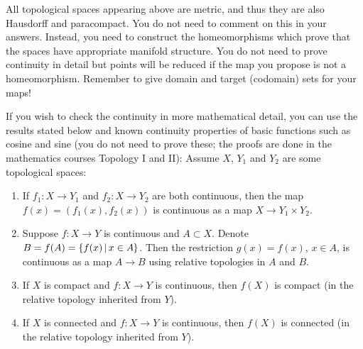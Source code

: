 \documentclass[12pt]{article}
\newcommand{\defset}[2]{ \left\{ #1 \left|\, #2\makebox[0pt]{$\displaystyle\phantom{#1}$}\right.\!\right\} }
\begin{document}
\medskip 

All topological spaces appearing above are metric, and thus they are also Hausdorff and paracompact.  You do not need to comment on this in your answers.  Instead, you need to construct the homeomorphisms which prove that the spaces have appropriate manifold structure.
You do not need to prove continuity in detail but points will be reduced if the map you propose is not a homeomorphism.  Remember to give domain and target (codomain) sets  for your maps!


\medskip 

If you wish to check the continuity in more mathematical detail, you can use the results stated below and known continuity properties of basic functions such as cosine and sine (you do not need to prove these; the proofs are done in the mathematics courses Topology I and II): Assume $X$, $Y_1$ and $Y_2$ are some topological spaces:
\begin{enumerate}
 \item If $f_1:X\to Y_1$ and $f_2:X \to Y_2$
 are both continuous, then the map $f(x) = (f_1(x),f_2(x))$ is continuous as a map $X\to Y_1\times Y_2$.
 \item Suppose $f:X\to Y$ is continuous and $A\subset X$.  Denote $B=f(A)=\defset{f(x)}{x\in A}$.
 Then the restriction $g(x)=f(x)$, $x\in A$, is continuous as a map $A\to B$ using relative topologies in $A$ and $B$.
 \item If $X$ is compact and $f:X\to Y$ is continuous, then $f(X)$ is compact (in the relative topology inherited from $Y$).
 \item If $X$ is connected and $f:X\to Y$ is continuous, then $f(X)$ is connected (in the relative topology inherited from $Y$).
\end{enumerate}
\end{document}
